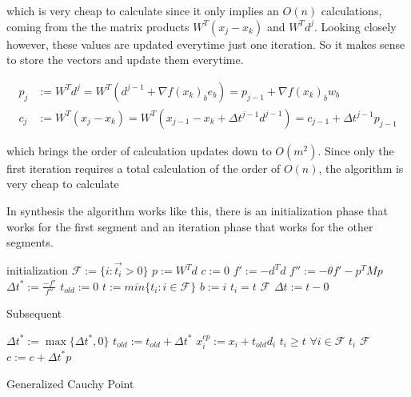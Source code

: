 which is very cheap to calculate since it only implies an $O(n)$ calculations, coming from the the matrix products $W^T(x_j - x_k)$ and $W^Td^j$.  Looking closely however, these values are updated everytime just one iteration.  So it makes sense to store the vectors and update them everytime.

\begin{align} \label{cp}
  p_j & := W^Td^j = W^T(d^{j-1} + \nabla f(x_k)_b e_b) = p_{j-1} + \nabla f(x_k)_b w_b \\
  c_j & := W^T(x_j - x_k) = W^T(x_{j-1} - x_k + \Delta t^{j-1} d^{j-1}) = c_{j-1} + \Delta t^{j-1} p_{j-1}
\end{align}

which brings the order of calculation updates down to $O(m^2)$.  Since only the first iteration requires a total calculation of the order of $O(n)$, the algorithm is very cheap to calculate

In synthesis the algorithm works like this, there is an initialization phase that works for the first segment and an iteration phase that works for the other segments.

\linesnumbered
\begin{algorithm}[H]
 \SetLine %
 
 initialization\;
 $\mathcal{F} := \{i: \vec{t_i} > 0\}$\;
 $p := W^Td$\;
 $c := 0$\;
 $f' := -d^Td$\;
 $f'' := - \theta f' - p^TMp$\;
 $\Delta t^* := \frac{-f'}{f''}$\;
 $t_{old} := 0$\;
 $t := min\{t_i: i \in \mathcal{F} \}$\;
 $b := i$  $t_i = t$ \;
  $\mathcal{F}$\;
 $\Delta t := t - 0$\;
 
 Subsequent\;
 
 $\Delta t^* := \max \{ \Delta t^*, 0\}$\;
 $t_{old} := t_{old} + \Delta t^*$\;
 $x_i^{cp} := x_i + t_{old}d_i$  $t_i \geq t$\;
 $\forall i \in \mathcal{F}$  $t_i$  $\mathcal{F}$\;
 $c := c + \Delta t^* p$\;
 \caption{Generalized Cauchy Point\label{CPalgo}}
\end{algorithm}

